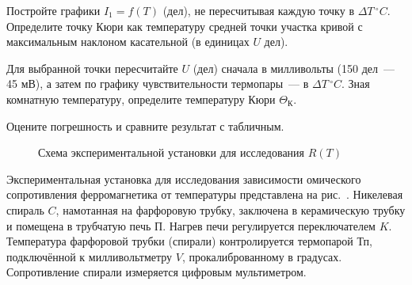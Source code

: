 \begin{lab:task}

\item
  Постройте графики $I_1 = f(T)$ (дел), не пересчитывая каждую точку в $\Delta
T\,^{\circ} C$. Определите точку Кюри как температуру средней точки участка
кривой с максимальным наклоном касательной (в единицах $U$ дел).

Для выбранной точки пересчитайте $U$ (дел) сначала в милливольты (150 дел~---
45 мВ), а затем по графику чувствительности термопары~--- в  $\Delta
T\,^{\circ} C$. Зная комнатную температуру, определите температуру Кюри
$\Theta_{К}$.


\item
  Оцените погрешность и сравните результат с табличным.

\end{lab:task}


\experiment

\begin{figure}[h!]
\centering
	\caption{Схема экспериментальной установки для исследования $R(T)$}
\end{figure}
Экспериментальная установка для исследования зависимости омического
сопротивления ферромагнетика от температуры представлена на
рис.~. Никелевая спираль $C$,
намотанная на фарфоровую трубку, заключена в керамическую трубку и помещена в
трубчатую печь $\text{П}$. Нагрев печи регулируется переключателем $K$.
Температура фарфоровой трубки (спирали) контролируется термопарой $\text{Тп}$,
подключённой к милливольтметру $V$, прокалиброванному в градусах. Сопротивление
спирали измеряется цифровым мультиметром.


